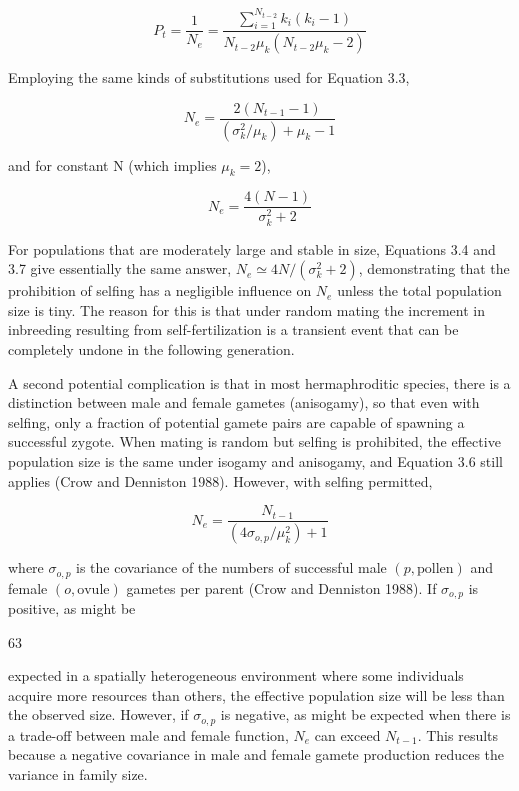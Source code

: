 \documentclass{article}
\begin{document}
\begin{equation}
P_{t}=\frac{1}{N_{e}}=\frac{\sum\limits_{i=1}^{N_{t-2}}k_{i}(k_{i}-1)}{N_{t-2}\mu_{k}(N_{t-2}\mu_{k}-2)}
\tag{3.5}
\label{eq:3_5}
\end{equation}

Employing the same kinds of substitutions used for Equation 3.3,

\begin{equation}
N_{e}=\frac{2(N_{t-1}-1)}{(\sigma_{k}^{2}/\mu_{k})+\mu_{k}-1}
\tag{3.6}
\label{eq:3_6}
\end{equation}

and for constant N (which implies  $ \mu_{k}=2 $),

\begin{equation}
N_{e}=\frac{4(N-1)}{\sigma_{k}^{2}+2}
\tag{3.7}
\label{eq:3_7}
\end{equation}

For populations that are moderately large and stable in size, Equations 3.4 and 3.7 give essentially the same answer,  $ N_e \simeq 4N / (\sigma_k^2 + 2) $, demonstrating that the prohibition of selfing has a negligible influence on  $ N_e $ unless the total population size is tiny. The reason for this is that under random mating the increment in inbreeding resulting from self-fertilization is a transient event that can be completely undone in the following generation.

A second potential complication is that in most hermaphroditic species, there is a distinction between male and female gametes (anisogamy), so that even with selfing, only a fraction of potential gamete pairs are capable of spawning a successful zygote. When mating is random but selfing is prohibited, the effective population size is the same under isogamy and anisogamy, and Equation 3.6 still applies (Crow and Denniston 1988). However, with selfing permitted,

\begin{equation}
N_{e}=\frac{N_{t-1}}{\left(4\sigma_{o,p}/\mu_{k}^{2}\right)+1}
\tag{3.8}
\label{eq:3_8}
\end{equation}

where  $ \sigma_{o,p} $ is the covariance of the numbers of successful male  $ (p,\mathrm{pollen}) $ and female  $ (o,\mathrm{ovule}) $ gametes per parent (Crow and Denniston 1988). If  $ \sigma_{o,p} $ is positive, as might be

63

expected in a spatially heterogeneous environment where some individuals acquire more resources than others, the effective population size will be less than the observed size. However, if  $ \sigma_{o,p} $ is negative, as might be expected when there is a trade-off between male and female function,  $ N_{e} $ can exceed  $ N_{t-1} $. This results because a negative covariance in male and female gamete production reduces the variance in family size.
\end{document}
